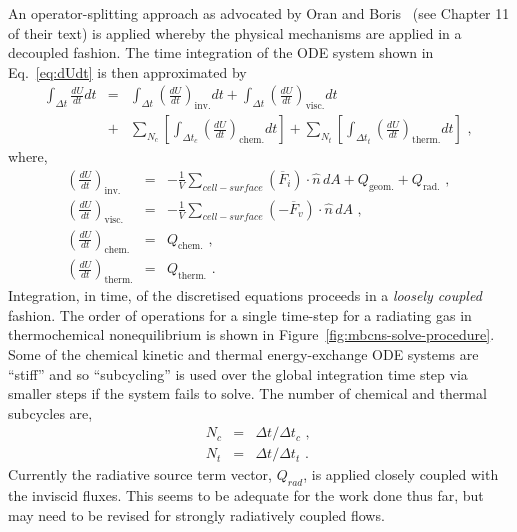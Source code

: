 \medskip 
An operator-splitting approach as advocated by Oran and Boris~\cite{OB2001} (see Chapter 11 of their text) 
is applied whereby the physical mechanisms are applied in a decoupled fashion.
The time integration of the ODE system shown in Eq.~\ref{eq:dUdt} is then approximated by
\begin{eqnarray}
 \int_{\Delta t} \frac{dU}{dt} dt &=& \int_{\Delta t} \left ( \frac{dU}{dt} \right )_{\text{inv.}} dt + \int_{\Delta t} \left ( \frac{dU}{dt} \right )_{\text{visc.}} dt \nonumber \\ 
 &+& \sum_{N_{c}} \left [ \int_{\Delta t_{c}} \left ( \frac{dU}{dt} \right )_{\text{chem.}} dt \right ] + \sum_{N_{t}} \left [ \int_{\Delta t_{t}} \left ( \frac{dU}{dt} \right )_{\text{therm.}} dt \right ] \text{ , }
 \label{eq:dUdt_sum}
\end{eqnarray}
where,
\begin{eqnarray}
 \left ( \frac{dU}{dt} \right )_{\text{inv.}} &=& - \frac{1}{V} \sum_{cell-surface} \left ( \overline{F}_{i} \right ) \cdot \hat{n} \, dA + Q_{\text{geom.}} + Q_{\text{rad.}} \text{ , } \label{eq:dUdt_inv} \\
 \left ( \frac{dU}{dt} \right )_{\text{visc.}}  &=& - \frac{1}{V} \sum_{cell-surface} \left ( - \overline{F}_{v} \right ) \cdot \hat{n} \, dA \text{ , } \label{eq:dUdt_visc} \\
 \left ( \frac{dU}{dt} \right )_{\text{chem.}}    &=& Q_{\text{chem.}} \text{ , } \label{eq:dUdt_chem} \\
 \left ( \frac{dU}{dt} \right )_{\text{therm.}}   &=& Q_{\text{therm.}} \text{ . } \label{eq:dUdt_therm}
\end{eqnarray}
%
Integration, in time, of the discretised equations proceeds in a \textit{loosely coupled} fashion.
The order of operations for a single time-step for a radiating gas in thermochemical nonequilibrium is
shown in Figure~\ref{fig:mbcns-solve-procedure}.
Some of the chemical kinetic and thermal energy-exchange ODE systems are 
``stiff'' and so ``subcycling'' is used over the global integration 
time step via smaller steps if the system fails to solve.
The number of chemical and thermal subcycles are,
\begin{eqnarray}
 N_{c} &=& \Delta t / \Delta t_{c} \text{ , } \nonumber \\ 
 N_{t} &=& \Delta t / \Delta t_{t} \text{ . } \nonumber
\end{eqnarray}
Currently the radiative source term vector, $Q_{rad}$, is applied closely coupled with the inviscid fluxes. 
This seems to be adequate for the work done thus far, 
but may need to be revised for strongly radiatively coupled flows.  

